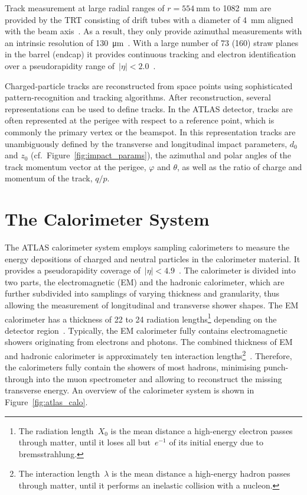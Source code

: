 Track measurement at large radial ranges of $r = \SI{554}{\milli\metre}$ to
\SI{1082}{\milli\metre} are provided by the TRT consisting of drift tubes with a
diameter of \SI{4}{\milli\metre} aligned with the beam
axis~\cite{atlas_detector}. As a result, they only provide azimuthal
measurements with an intrinsic resolution of
\SI{130}{\micro\metre}~\cite{atlas_detector}. With a large number of 73 (160)
straw planes in the barrel (endcap) it provides continuous tracking and electron
identification over a pseudorapidity range
of~$|\eta| < 2.0$~\cite{atlas_detector}.

Charged-particle tracks are reconstructed from space points using sophisticated
pattern-recognition and tracking algorithms. After reconstruction, several
representations can be used to define tracks. In the ATLAS detector, tracks are
often represented at the perigee with respect to a reference point, which is
commonly the primary vertex or the beamspot. In this representation tracks are
unambiguously defined by the transverse and longitudinal impact parameters,
$d_0$ and $z_0$ (cf.\ Figure~\ref{fig:impact_params}), the azimuthal and polar
angles of the track momentum vector at the perigee, $\varphi$ and $\theta$, as
well as the ratio of charge and momentum of the track, $q / p$.


\section{The Calorimeter System}
\label{sec:atlas_calo}

The ATLAS calorimeter system employs sampling calorimeters to measure the energy
depositions of charged and neutral particles in the calorimeter material. It
provides a pseudorapidity coverage
of~\mbox{$|\eta| < 4.9$}~\cite{atlas_detector}. The calorimeter is divided into
two parts, the electromagnetic (EM) and the hadronic calorimeter, which are
further subdivided into samplings of varying thickness and granularity, thus
allowing the measurement of longitudinal and transverse shower shapes. The EM
calorimeter has a thickness of 22 to 24 radiation lengths\footnote{The radiation
  length~$X_0$ is the mean distance a high-energy electron passes through
  matter, until it loses all but~$e^{-1}$ of its initial energy due to
  bremsstrahlung.} depending on the detector region~\cite{atlas_detector}.
Typically, the EM calorimeter fully contains electromagnetic showers originating
from electrons and photons. The combined thickness of EM and hadronic
calorimeter is approximately ten interaction lengths\footnote{The interaction
  length~$\lambda$ is the mean distance a high-energy hadron passes through
  matter, until it performs an inelastic collision with a
  nucleon.}~\cite{atlas_detector}. Therefore, the calorimeters fully contain the
showers of most hadrons, minimising punch-through into the muon spectrometer and
allowing to reconstruct the missing transverse energy. An overview of the
calorimeter system is shown in Figure~\ref{fig:atlas_calo}.

